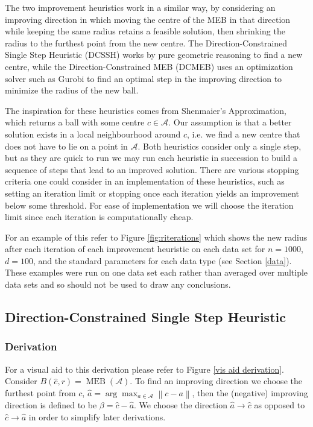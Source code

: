 \documentclass[11pt,twoside]{report}
\newcommand{\A}{\mathcal{A}} %
\newcommand{\norm}[1]{\left\lVert#1\right\rVert} %
\DeclareMathOperator{\MEB}{MEB}
\theoremstyle{definition}
\numberwithin{theorem}{section}
\numberwithin{definition}{section}
\numberwithin{lemma}{section}
\numberwithin{proposition}{section}
\numberwithin{equation}{section}
\numberwithin{figure}{section}
\begin{document}
The two improvement heuristics work in a similar way, by considering an improving direction in which moving the centre of the MEB in that direction while keeping the same radius retains a feasible solution, then shrinking the radius to the furthest point from the new centre. The Direction-Constrained Single Step Heuristic (DCSSH) works by pure geometric reasoning to find a new centre, while the Direction-Constrained MEB (DCMEB) uses an optimization solver such as Gurobi to find an optimal step in the improving direction to minimize the radius of the new ball.

The inspiration for these heuristics comes from Shenmaier's Approximation, which returns a ball with some centre $c\in\A$. Our assumption is that a better solution exists in a local neighbourhood around $c$, i.e. we find a new centre that does not have to lie on a point in $\A$. Both heuristics consider only a single step, but as they are quick to run we may run each heuristic in succession to build a sequence of steps that lead to an improved solution. There are various stopping criteria one could consider in an implementation of these heuristics, such as setting an iteration limit or stopping once each iteration yields an improvement below some threshold. For ease of implementation we will choose the iteration limit since each iteration is computationally cheap.

For an example of this refer to Figure \ref{fig:riterations} which shows the new radius after each iteration of each improvement heuristic on each data set for $n=1000$, $d=100$, and the standard parameters for each data type (see Section \ref{data}). These examples were run on one data set each rather than averaged over multiple data sets and so should not be used to draw any conclusions.

\subsection{Direction-Constrained Single Step Heuristic}
\subsubsection{Derivation}
For a visual aid to this derivation please refer to Figure \ref{vis aid derivation}. Consider $B(\hat{c}, r) = \MEB(\A)$. To find an improving direction we choose the furthest point from $c$, $\hat{a}=\arg\max_{a\in\A}\norm{c-a}$, then the (negative) improving direction is defined to be $\beta=\hat{c}-\hat{a}$. We choose the direction $\hat{a}\to\hat{c}$ as opposed to $\hat{c}\to\hat{a}$ in order to simplify later derivations.
\end{document}
